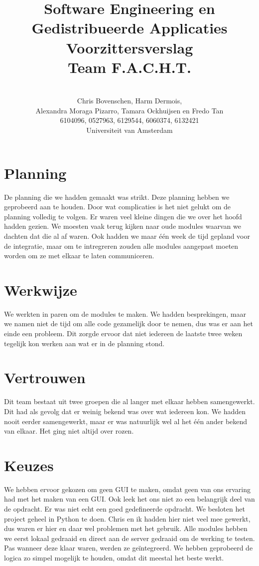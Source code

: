\documentclass[a4paper,10pt]{article}
\title{Software Engineering en Gedistribueerde Applicaties \\[10pt]Voorzittersverslag\\[25pt]Team F.A.C.H.T.}
\author{\\Chris Bovenschen, Harm Dermois, \\Alexandra Moraga Pizarro, Tamara Ockhuijsen en Fredo Tan \\[10pt]6104096, 0527963, 6129544, 6060374, 6132421 \\[25pt]Universiteit van Amsterdam}
\begin{document}
\maketitle
\newpage
\section{Planning}
De planning die we hadden gemaakt was strikt. Deze planning hebben we geprobeerd aan te houden. Door wat complicaties is het niet gelukt om de planning volledig te volgen. Er waren veel kleine dingen die we over het hoofd hadden gezien. We moesten vaak terug kijken naar oude modules waarvan we dachten dat die al af waren. Ook hadden we maar \'{e}\'{e}n week de tijd gepland voor de integratie, maar om te intregreren zouden alle modules aangepast moeten worden om ze met elkaar te laten communiceren.
\section{Werkwijze}
We werkten in paren om de modules te maken. We hadden besprekingen, maar we namen niet de tijd om alle code gezamelijk door te nemen, dus was er aan het einde een probleem. Dit zorgde ervoor dat niet iedereen de laatste twee weken tegelijk kon werken aan wat er in de planning stond.
\section{Vertrouwen}
Dit team bestaat uit twee groepen die al langer met elkaar hebben samengewerkt. Dit had als gevolg dat er weinig bekend was over wat iedereen kon. We hadden nooit eerder samengewerkt, maar er was natuurlijk wel al het \'{e}\'{e}n ander bekend van elkaar. Het ging niet altijd over rozen.
\section{Keuzes}
We hebben ervoor gekozen om geen GUI te maken, omdat geen van ons ervaring had met het maken van een GUI. Ook leek het ons niet zo een belangrijk deel van de opdracht. Er was niet echt een goed gedefineerde opdracht. 
We besloten het project geheel in Python te doen. Chris en ik hadden hier niet veel mee gewerkt, dus waren er hier en daar wel problemen met het gebruik.
Alle modules hebben we eerst lokaal gedraaid en direct aan de server gedraaid om de werking te testen. Pas wanneer deze klaar waren, werden ze ge\"{i}ntegreerd.
We hebben geprobeerd de logica zo simpel mogelijk te houden, omdat dit meestal het beste werkt.
\end{document}

